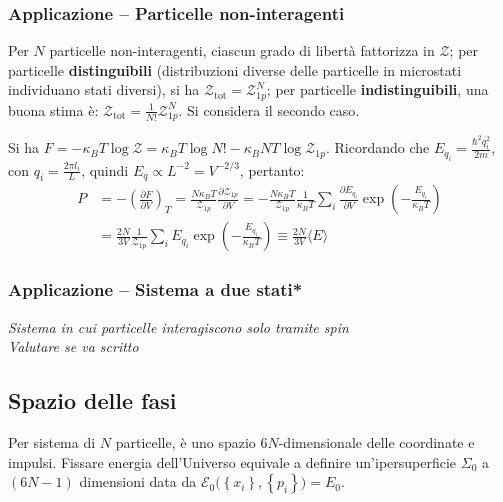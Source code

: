 \documentclass[10pt, a4paper]{scrartcl}
\numberwithin{equation}{subsection}
\theoremstyle{style1}
\newenvironment{boxenv}[1][]{
    \begin{eqbox}[#1]
    }{
   \end{eqbox}
}
\begin{document}
\subsubsection{Applicazione -- Particelle non-interagenti}

Per $N$ particelle non-interagenti, ciascun grado di libert\`a fattorizza in $\mathscr{Z}$; per particelle \textbf{distinguibili} (distribuzioni diverse delle particelle in microstati individuano stati diversi), si ha $\mathscr{Z}_\text{tot} = \mathscr{Z}_{1p} ^N$; per particelle \textbf{indistinguibili}, una buona stima \`e: $\mathscr{Z}_\text{tot} = \frac{1}{N!}\mathscr{Z}_{1p} ^N$. Si considera il secondo caso.

Si ha $F = - \kappa _B T \log \mathscr{Z}= \kappa _B T \log N! - \kappa _B N T \log \mathscr{Z}_{1p} $. Ricordando che $E_{q_i}  = \frac{\hbar ^2 q_{i} ^2}{2m} $, con $q _ i= \frac{2\pi l_i}{L}$, quindi $E_q \propto L^{-2} = V^{-2 / 3} $, pertanto:
\[
\begin{split}
	P &= - \left(\frac{\partial F}{\partial V} \right) _T = \frac{N\kappa _B T}{\mathscr{Z}_{1p} }\frac{\partial \mathscr{Z}_{1p} }{\partial V} = - \frac{N\kappa _B T}{\mathscr{Z}_{1p} }\frac{1}{\kappa _BT} \sum_{i}^{} \frac{\partial E_{q_i} }{\partial V} \exp \left(- \frac{E_{q_i} }{\kappa _B T}\right) \\
	  &= \frac{2N}{3V}\frac{1}{\mathscr{Z}_{1p} } \sum_{i}^{} E_{q_i} \exp \left( - \frac{E_{q_i} }{\kappa _BT}\right) \equiv \frac{2N}{3V} \langle E \rangle
\end{split}
\] 


\subsubsection{Applicazione -- Sistema a due stati*}
\begin{boxenv}[]
\centering \textit{Sistema in cui particelle interagiscono solo tramite spin\\ Valutare se va scritto} 
\end{boxenv}
\subsection{Spazio delle fasi}

Per sistema di $N$ particelle, \`e uno spazio $6N$-dimensionale delle coordinate e impulsi. Fissare energia dell'Universo equivale a definire un'ipersuperficie $\Sigma_0$ a $(6N-1)$ dimensioni data da $\mathscr{E}_0\big(\left\{ x_i \right\} , \left\{ p_i \right\} \big) = E_0$.
\end{document}
